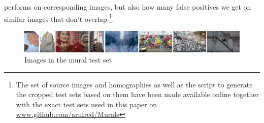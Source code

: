 \documentclass[12pt,journal,compsoc]{IEEEtran}
\begin{document}
performs on corresponding images, but also how many false positives we 
get on similar images that don't overlap.\footnote{The set of source 
	images and homographies as well as the script to generate the 
cropped test sets based on them have been made available online together 
with the exact test sets used in this paper on 
\href{https://github.com/arnfred/Murals}{www.github.com/arnfred/Murals}}.
%
\begin{figure}
	\centering
	\includegraphics[width=\textwidth]{images/murals}
	\caption{Images in the mural test set}
	\label{fig:mural}
\end{figure}
%
\begin{figure}
\end{figure}
\end{document}

